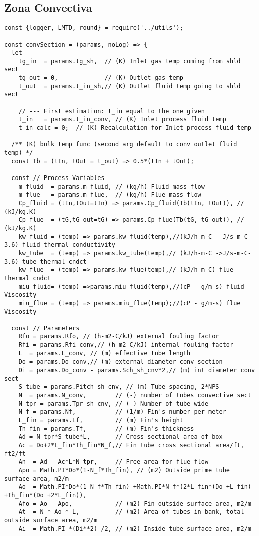 \subsection{Zona Convectiva}
\begin{verbatim}
const {logger, LMTD, round} = require('../utils');

const convSection = (params, noLog) => {
  let
    tg_in  = params.tg_sh,  // (K) Inlet gas temp coming from shld sect
    tg_out = 0,             // (K) Outlet gas temp
    t_out  = params.t_in_sh,// (K) Outlet fluid temp going to shld sect

    // --- First estimation: t_in equal to the one given
    t_in   = params.t_in_conv, // (K) Inlet process fluid temp
    t_in_calc = 0;  // (K) Recalculation for Inlet process fluid temp

  /** (K) bulk temp func (second arg default to conv outlet fluid temp) */
  const Tb = (tIn, tOut = t_out) => 0.5*(tIn + tOut);

  const // Process Variables
    m_fluid  = params.m_fluid, // (kg/h) Fluid mass flow
    m_flue   = params.m_flue,  // (kg/h) Flue mass flow
    Cp_fluid = (tIn,tOut=tIn) => params.Cp_fluid(Tb(tIn, tOut)), // (kJ/kg.K)
    Cp_flue  = (tG,tG_out=tG) => params.Cp_flue(Tb(tG, tG_out)), // (kJ/kg.K)
    kw_fluid = (temp) => params.kw_fluid(temp),//(kJ/h-m-C - J/s-m-C-3.6) fluid thermal conductivity
    kw_tube  = (temp) => params.kw_tube(temp),// (kJ/h-m-C ->J/s-m-C-3.6) tube thermal cndct
    kw_flue  = (temp) => params.kw_flue(temp),// (kJ/h-m-C) flue thermal cndct
    miu_fluid= (temp) =>params.miu_fluid(temp),//(cP - g/m-s) fluid Viscosity
    miu_flue = (temp) => params.miu_flue(temp);//(cP - g/m-s) flue Viscosity

  const // Parameters
    Rfo = params.Rfo, // (h-m2-C/kJ) external fouling factor
    Rfi = params.Rfi_conv,// (h-m2-C/kJ) internal fouling factor
    L  = params.L_conv, // (m) effective tube length
    Do = params.Do_conv,// (m) external diameter conv section
    Di = params.Do_conv - params.Sch_sh_cnv*2,// (m) int diameter conv sect
    S_tube = params.Pitch_sh_cnv, // (m) Tube spacing, 2*NPS
    N  = params.N_conv,        // (-) number of tubes convective sect
    N_tpr = params.Tpr_sh_cnv, // (-) Number of tube wide
    N_f = params.Nf,           // (1/m) Fin's number per meter
    L_fin = params.Lf,         // (m) Fin's height
    Th_fin = params.Tf,        // (m) Fin's thickness
    Ad = N_tpr*S_tube*L,       // Cross sectional area of box
    Ac = Do+2*L_fin*Th_fin*N_f,// Fin tube cross sectional area/ft, ft2/ft
    An  = Ad - Ac*L*N_tpr,     // Free area for flue flow
    Apo = Math.PI*Do*(1-N_f*Th_fin), // (m2) Outside prime tube surface area, m2/m
    Ao  = Math.PI*Do*(1-N_f*Th_fin) +Math.PI*N_f*(2*L_fin*(Do +L_fin) +Th_fin*(Do +2*L_fin)),
    Afo = Ao - Apo,            // (m2) Fin outside surface area, m2/m
    At  = N * Ao * L,          // (m2) Area of tubes in bank, total outside surface area, m2/m
    Ai  = Math.PI *(Di**2) /2, // (m2) Inside tube surface area, m2/m


\end{verbatim}
